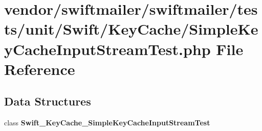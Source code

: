 \section{vendor/swiftmailer/swiftmailer/tests/unit/\+Swift/\+Key\+Cache/\+Simple\+Key\+Cache\+Input\+Stream\+Test.php File Reference}
\label{_simple_key_cache_input_stream_test_8php}
\subsection*{Data Structures}
\begin{DoxyCompactItemize}
\item 
class {\bf Swift\+\_\+\+Key\+Cache\+\_\+\+Simple\+Key\+Cache\+Input\+Stream\+Test}
\end{DoxyCompactItemize}
